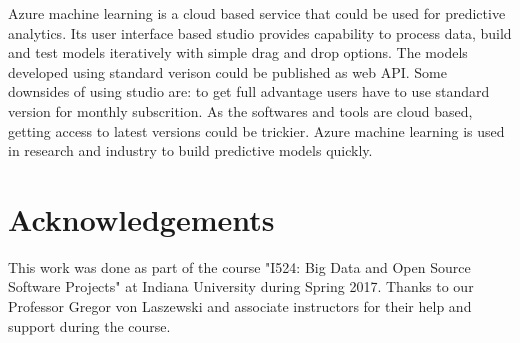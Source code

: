 \documentclass[9pt,twocolumn,twoside]{styles/osajnl}
\begin{document}
Azure machine learning is a cloud based service that could be used for
predictive analytics. Its user interface based studio provides
capability to process data, build and test models iteratively with
simple drag and drop options. The models developed using standard
verison could be published as web API. Some downsides of using studio
are: to get full advantage users have to use standard version for
monthly subscrition. As the softwares and tools are cloud based,
getting access to latest versions could be trickier. Azure machine
learning is used in research and industry to build predictive models
quickly.


\section*{Acknowledgements}

This work was done as part of the course "I524: Big Data and Open
Source Software Projects" at Indiana University during Spring
2017. Thanks to our Professor Gregor von Laszewski and associate
instructors for their help and support during the course. 


\end{document}
